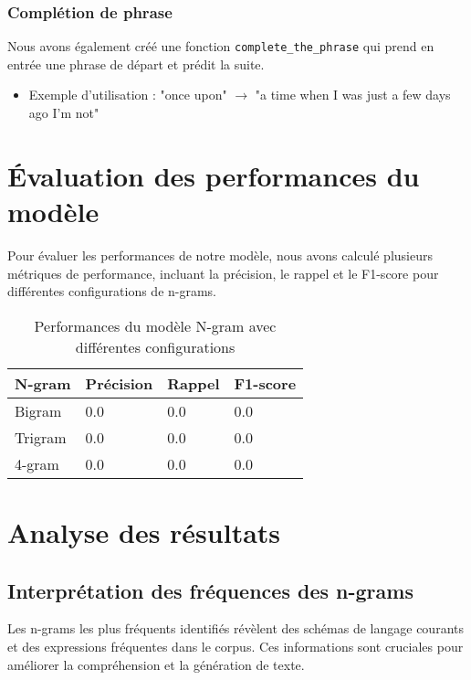 \subsubsection*{Complétion de phrase}

Nous avons également créé une fonction \texttt{complete\_the\_phrase} qui prend en entrée une phrase de départ et prédit la suite.

\begin{itemize}
    \item Exemple d'utilisation : "once upon" $\rightarrow$ "a time when I was just a few days ago I’m not"
\end{itemize}

\section{Évaluation des performances du modèle}

Pour évaluer les performances de notre modèle, nous avons calculé plusieurs métriques de performance, incluant la précision, le rappel et le F1-score pour différentes configurations de n-grams.

\begin{table}[h]
    \centering
    \begin{tabular}{|l|l|l|l|}
    \hline
    \textbf{N-gram} & \textbf{Précision} & \textbf{Rappel} & \textbf{F1-score} \\ \hline
    Bigram & 0.0 & 0.0 & 0.0 \\ \hline
    Trigram & 0.0 & 0.0 & 0.0 \\ \hline
    4-gram & 0.0 & 0.0 & 0.0 \\ \hline
    \end{tabular}
    \caption{Performances du modèle N-gram avec différentes configurations}
\end{table}

\section{Analyse des résultats}

\subsection{Interprétation des fréquences des n-grams}

Les n-grams les plus fréquents identifiés révèlent des schémas de langage courants et des expressions fréquentes dans le corpus. Ces informations sont cruciales pour améliorer la compréhension et la génération de texte.

